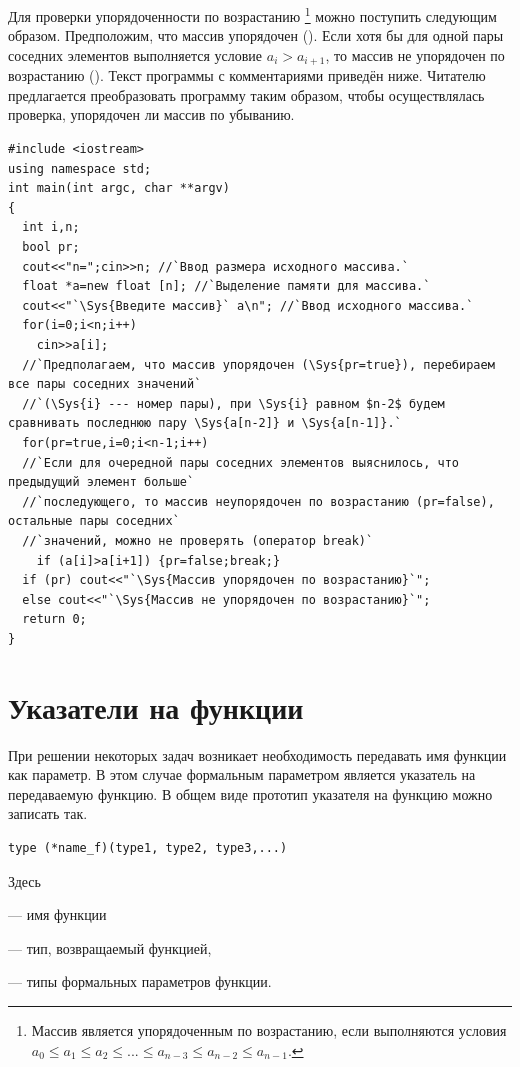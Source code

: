 Для проверки упорядоченности по возрастанию \footnote{Массив является упорядоченным по
возрастанию, если выполняются условия  $a_0\leqslant a_1\leqslant a_2\leqslant ...\leqslant a_{n-3}\leqslant a_{n-2}\leqslant a_{n-1}$.} можно
поступить следующим образом. Предположим, что массив упорядочен (). Если хотя бы для одной
пары соседних элементов выполняется условие $a_i>a_{i+1}$, то массив не упорядочен по возрастанию
(). Текст программы с комментариями приведён ниже. Читателю предлагается преобразовать
программу таким образом, чтобы осуществлялась проверка, упорядочен ли массив по убыванию.
\begin{lstlisting}
#include <iostream>
using namespace std;
int main(int argc, char **argv)
{
  int i,n;
  bool pr;
  cout<<"n=";cin>>n; //`Ввод размера исходного массива.`
  float *a=new float [n]; //`Выделение памяти для массива.`
  cout<<"`\Sys{Введите массив}` a\n"; //`Ввод исходного массива.`
  for(i=0;i<n;i++)
    cin>>a[i];
  //`Предполагаем, что массив упорядочен (\Sys{pr=true}), перебираем все пары соседних значений`
  //`(\Sys{i} --- номер пары), при \Sys{i} равном $n-2$ будем сравнивать последнюю пару \Sys{a[n-2]} и \Sys{a[n-1]}.`
  for(pr=true,i=0;i<n-1;i++)
  //`Если для очередной пары соседних элементов выяснилось, что предыдущий элемент больше` 
  //`последующего, то массив неупорядочен по возрастанию (pr=false), остальные пары соседних` 
  //`значений, можно не проверять (оператор break)` 
    if (a[i]>a[i+1]) {pr=false;break;}
  if (pr) cout<<"`\Sys{Массив упорядочен по возрастанию}`";
  else cout<<"`\Sys{Массив не упорядочен по возрастанию}`";
  return 0;
}
\end{lstlisting}

\section[Указатели на функции]{Указатели на функции}
При решении некоторых задач возникает необходимость передавать имя функции как параметр. В этом случае формальным
параметром является указатель на передаваемую функцию. В общем виде прототип указателя на функцию можно записать так.
\begin{lstlisting}
type (*name_f)(type1, type2, type3,...)
\end{lstlisting}
Здесь

 --- имя функции

 --- тип, возвращаемый функцией, 

 --- типы формальных параметров функции.

